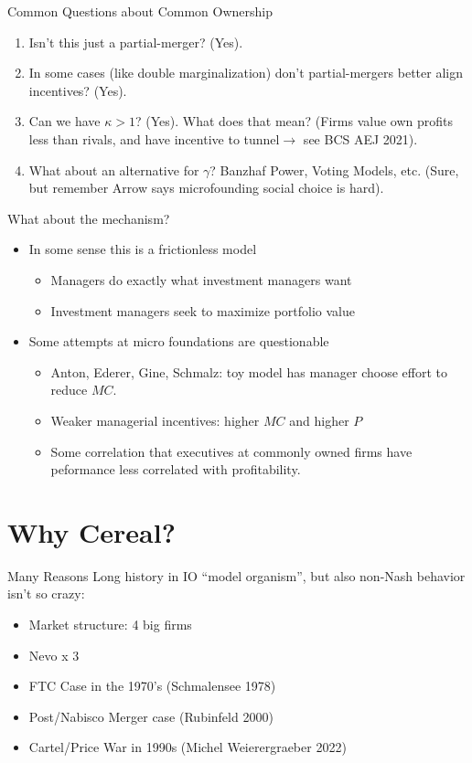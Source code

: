 \documentclass[handout,aspectratio=169,10pt]{beamer}
\begin{document}
\begin{frame}[plain]{Common Questions about Common Ownership}
\begin{enumerate}
\item Isn't this just a partial-merger? (Yes).
\item In some cases (like double marginalization) don't partial-mergers better align incentives? (Yes).
\item Can we have $\kappa > 1$? (Yes). What does that mean? (Firms value own profits less than rivals, and have incentive to \alert{tunnel}$\rightarrow$ see BCS AEJ 2021).
\item What about an alternative for $\gamma$? Banzhaf Power, Voting Models, etc. (Sure, but remember Arrow says microfounding social choice is hard).
\end{enumerate}
 \end{frame}




\begin{frame}[plain]{What about the mechanism?}
\begin{itemize}
\item In some sense this is a \alert{frictionless} model
\begin{itemize}
  \item Managers do exactly what investment managers want
  \item Investment managers seek to maximize \alert{portfolio value}
\end{itemize}
\item Some attempts at micro foundations are questionable
\begin{itemize}
  \item Anton, Ederer, Gine, Schmalz: toy model has manager choose effort to reduce $MC$.
  \item Weaker managerial incentives: higher $MC$ and higher $P$
  \item Some correlation that executives at commonly owned firms have peformance less correlated with profitability.
\end{itemize}
\end{itemize}
 \end{frame}




\section{Why Cereal?}

\begin{frame}{Many Reasons}
Long history in IO ``model organism'', but also non-Nash behavior isn't so crazy:
\begin{itemize}
\item Market structure: 4 big firms
\item Nevo x 3
\item FTC Case in the 1970's (Schmalensee 1978)
\item Post/Nabisco Merger case (Rubinfeld 2000)
\item Cartel/Price War in 1990s (Michel Weierergraeber 2022)
\end{itemize}
\end{frame}
\end{document}
